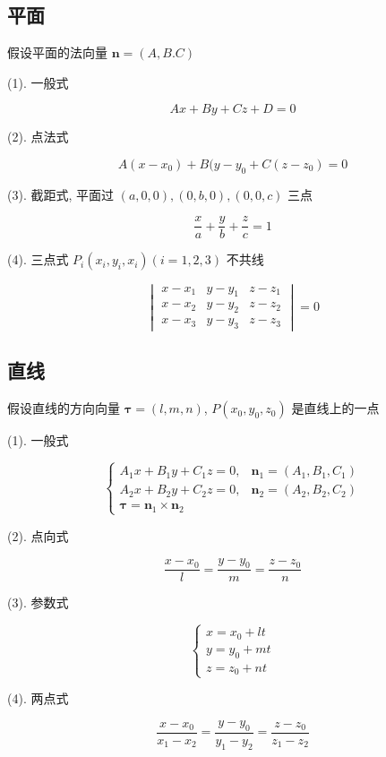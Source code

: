 \subsection{平面}

\begin{definition}[平面方程]
	
	假设平面的法向量 $\boldsymbol{n} = (A, B. C)$

	(1). 一般式
	
	$$Ax+By+Cz+D=0$$

	
	(2). 点法式
	
	$$A(x-x_{0})+B(y-y_{0}+C(z-z_{0})=0$$
	
	(3). 截距式, 平面过 $(a,0,0), (0,b,0), (0,0,c)$ 三点
	
	$$\dfrac{x}{a}+\dfrac{y}{b}+\dfrac{z}{c}=1$$	
	
	(4). 三点式 $P_{i} (x_{i}, y_{i}, x_{i})(i = 1,2,3)$ 不共线  
	
	$$\begin{vmatrix}
		x-x_{1} & y-y_{1} & z-z_{1}\\
		x-x_{2} & y-y_{2} & z-z_{2}\\
		x-x_{3} & y-y_{3} & z-z_{3}
	\end{vmatrix} = 0$$
\end{definition}

\subsection{直线}

\begin{definition}[直线方程]
	
	假设直线的方向向量 $\boldsymbol{\tau} = (l,m,n)$, $P(x_{0},y_{0},z_{0})$ 是直线上的一点

	(1). 一般式
	
	$$\begin{cases}
		A_{1}x+B_{1}y+C_{1}z = 0, & \boldsymbol{n}_{1}=(A_{1},B_{1},C_{1})\\
		A_{2}x+B_{2}y+C_{2}z = 0, & \boldsymbol{n}_{2}=(A_{2},B_{2},C_{2})\\
		\boldsymbol{\tau} = \boldsymbol{n}_{1}\times \boldsymbol{n}_{2} 
	\end{cases}$$
	
	(2). 点向式
	
	$$\dfrac{x-x_{0}}{l}=\dfrac{y-y_{0}}{m}=\dfrac{z-z_{0}}{n}$$
	
	(3). 参数式
	
	$$\begin{cases}
		x = x_{0} + lt\\
		y = y_{0} + mt\\
		z = z_{0} + nt
	\end{cases}$$
	
	(4). 两点式
	
	$$\dfrac{x-x_{0}}{x_{1}-x_{2}}=\dfrac{y-y_{0}}{y_{1}-y_{2}}=\dfrac{z-z_{0}}{z_{1}-z_{2}}$$
\end{definition}

